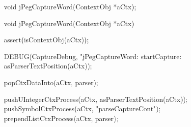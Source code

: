\startCHeader
void jPegCaptureWord(ContextObj *aCtx);
\stopCHeader

\startCCode
void jPegCaptureWord(ContextObj *aCtx){
  assert(isContextObj(aCtx));
  
  DEBUG(CaptureDebug, "jPegCaptureWord: startCapture: %
    asParserTextPosition(aCtx));

  popCtxDataInto(aCtx, parser);
    
  pushUIntegerCtxProcess(aCtx, asParserTextPosition(aCtx));
  pushSymbolCtxProcess(aCtx, "parseCaptureCont");
  prependListCtxProcess(aCtx, parser);
}
\stopCCode